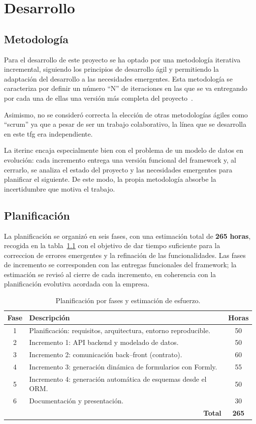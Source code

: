 \chapter{Desarrollo}
\section{Metodología}
Para el desarrollo de este proyecto se ha optado por una metodología iterativa incremental, 
siguiendo los principios de desarrollo ágil y permitiendo la adaptación del desarrollo a las 
necesidades emergentes. Esta metodología se caracteriza por definir un número ``N'' de iteraciones 
en las que se va entregando por cada una de ellas una versión más completa del proyecto~\cite{larman2004applying}.

Asimismo, no se consideró correcta la elección de otras metodologías ágiles como 
``\gls{scrum}'' ya que a pesar de ser un trabajo colaborativo, la línea que se desarrolla 
en este tfg era independiente.

La \gls{iterinc} encaja especialmente bien con el problema de un modelo de
datos en evolución: cada incremento entrega una versión funcional del
framework y, al cerrarlo, se analiza el estado del proyecto y las necesidades
emergentes para planificar el siguiente. De este modo, la propia metodología
absorbe la incertidumbre que motiva el trabajo.

\section{Planificación}
La planificación se organizó en seis fases, con una estimación total de
\textbf{265 horas}, recogida en la tabla~\ref{tab:plan} con el objetivo de dar tiempo
suficiente para la correccion de errores emergentes y la refinación de las funcionalidades. Las fases de
incremento se corresponden con las entregas funcionales del framework; la
estimación se revisó al cierre de cada incremento, en coherencia con la
planificación evolutiva acordada con la empresa. 

\begin{table}[!htbp]
\caption{Planificación por fases y estimación de esfuerzo.}
\label{tab:plan}
\centering
\begin{tabular}{|c|p{8.5cm}|c|}
\hline
\textbf{Fase} & \textbf{Descripción} & \textbf{Horas} \\ \hline
1 & Planificación: requisitos, arquitectura, entorno reproducible. & 50 \\ \hline
2 & Incremento 1: API backend y modelado de datos. & 50 \\ \hline
3 & Incremento 2: comunicación back--front (contrato). & 60 \\ \hline
4 & Incremento 3: generación dinámica de formularios con Formly. & 55 \\ \hline
5 & Incremento 4: generación automática de esquemas desde el ORM. & 50 \\ \hline
6 & Documentación y presentación. & 30 \\ \hline
\multicolumn{2}{|r|}{\textbf{Total}} & \textbf{265} \\ \hline
\end{tabular}
\end{table}

